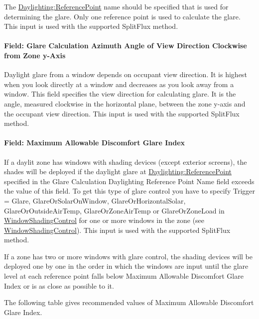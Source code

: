 The \hyperref[daylightingreferencepoint-000]{Daylighting:ReferencePoint} name should be specified that is used for determining the glare. Only one reference point is used to calculate the glare. This input is used with the supported SplitFlux method.

\paragraph{Field: Glare Calculation Azimuth Angle of View Direction Clockwise from Zone y-Axis}\label{field-glare-calculation-azimuth-angle-of-view-direction-clockwise-from-zone-y-axis}

Daylight glare from a window depends on occupant view direction. It is highest when you look directly at a window and decreases as you look away from a window. This field specifies the view direction for calculating glare. It is the angle, measured clockwise in the horizontal plane, between the zone y-axis and the occupant view direction. This input is used with the supported SplitFlux method.

\paragraph{Field: Maximum Allowable Discomfort Glare Index}\label{field-maximum-allowable-discomfort-glare-index}

If a daylit zone has windows with shading devices (except exterior screens), the shades will be deployed if the daylight glare at \hyperref[daylightingreferencepoint-000]{Daylighting:ReferencePoint} specified in the Glare Calculation Daylighting Reference Point Name field exceeds the value of this field. To get this type of glare control you have to specify Trigger = Glare, GlareOrSolarOnWindow, GlareOrHorizontalSolar, GlareOrOutsideAirTemp, GlareOrZoneAirTemp or GlareOrZoneLoad in \hyperref[windowpropertyshadingcontrol]{WindowShadingControl} for one or more windows in the zone (see \hyperref[windowpropertyshadingcontrol]{WindowShadingControl}). This input is used with the supported SplitFlux method.

If a zone has two or more windows with glare control, the shading devices will be deployed one by one in the order in which the windows are input until the glare level at each reference point falls below Maximum Allowable Discomfort Glare Index or is as close as possible to it.

The following table gives recommended values of Maximum Allowable Discomfort Glare Index.

